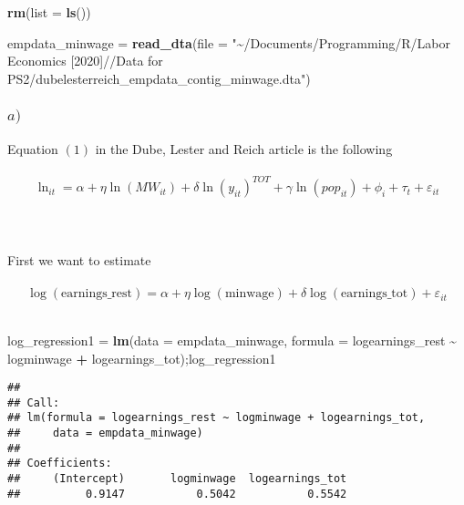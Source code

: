 \documentclass[
]{article}
\newenvironment{Shaded}{\begin{snugshade}}{\end{snugshade}}
\newcommand{\DataTypeTok}[1]{\textcolor[rgb]{0.13,0.29,0.53}{#1}}
\newcommand{\KeywordTok}[1]{\textcolor[rgb]{0.13,0.29,0.53}{\textbf{#1}}}
\newcommand{\NormalTok}[1]{#1}
\newcommand{\OperatorTok}[1]{\textcolor[rgb]{0.81,0.36,0.00}{\textbf{#1}}}
\newcommand{\StringTok}[1]{\textcolor[rgb]{0.31,0.60,0.02}{#1}}
\begin{document}
\begin{Shaded}
\begin{Highlighting}[]
\KeywordTok{rm}\NormalTok{(}\DataTypeTok{list =} \KeywordTok{ls}\NormalTok{())}

\NormalTok{empdata\_minwage =}\StringTok{ }\KeywordTok{read\_dta}\NormalTok{(}\DataTypeTok{file =} \StringTok{"\textasciitilde{}/Documents/Programming/R/Labor Economics [2020]//Data for PS2/dubelesterreich\_empdata\_contig\_minwage.dta"}\NormalTok{)}
\end{Highlighting}
\end{Shaded}

\hfill\break
\hfill\break
\hfill\break

\hypertarget{a-1}{%
\subsubsection{\texorpdfstring{\(a)\)}{a)}}\label{a-1}}

\hfill\break
\hfill\break
Equation \((1)\) in the Dube, Lester and Reich article is the
following\\
~\\
\[\ln_{it} = \alpha + \eta\ln(MW_{it}) + \delta\ln(y_{it})^{TOT} + \gamma\ln(pop_{it}) + \phi_i + \tau_t + \varepsilon_{it}\]\\
~\\
~\\
First we want to estimate\\
~\\

\[\log(\textrm{earnings_rest}) = \alpha + \eta\log(\textrm{minwage}) + \delta\log(\textrm{earnings_tot}) + \varepsilon_{it}\]\\

\begin{Shaded}
\begin{Highlighting}[]
\NormalTok{log\_regression1 =}\StringTok{ }\KeywordTok{lm}\NormalTok{(}\DataTypeTok{data =}\NormalTok{ empdata\_minwage, }\DataTypeTok{formula =}\NormalTok{ logearnings\_rest }\OperatorTok{\textasciitilde{}}\StringTok{ }\NormalTok{logminwage }\OperatorTok{+}\StringTok{ }\NormalTok{logearnings\_tot);log\_regression1}
\end{Highlighting}
\end{Shaded}

\begin{verbatim}
## 
## Call:
## lm(formula = logearnings_rest ~ logminwage + logearnings_tot, 
##     data = empdata_minwage)
## 
## Coefficients:
##     (Intercept)       logminwage  logearnings_tot  
##          0.9147           0.5042           0.5542
\end{verbatim}
\end{document}
